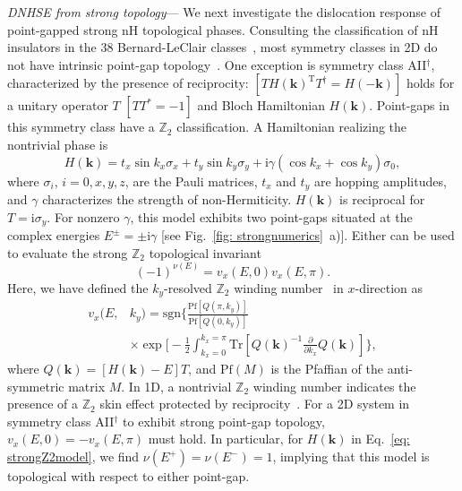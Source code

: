 \documentclass[aps,prl,twocolumn,amsmath,amssymb,floatfix,superscriptaddress]{revtex4-2}
\newcommand{\bs}[1]{\boldsymbol{#1}}
\begin{document}
\emph{DNHSE from strong topology}--- We next investigate the dislocation response of point-gapped strong nH topological phases. Consulting the classification of nH insulators in the 38 Bernard-LeClair classes~\cite{KawabataClassification19}, most symmetry classes in 2D do not have intrinsic point-gap topology~\cite{TopoSkin20}. One exception is symmetry class AII$^\dagger$, characterized by the presence of reciprocity: $[T H(\bs{k})^\mathrm{T} T^\dagger = H(-\bs{k})]$ holds for a unitary operator $T$ $[T T^* = -1]$ and Bloch Hamiltonian $H(\bs{k})$.
Point-gaps in this symmetry class have a $\mathbb{Z}_2$ classification. A Hamiltonian realizing the nontrivial phase is~\cite{TopoSkin20}
\begin{equation} \label{eq: strongZ2model}
H(\bs{k}) = t_x \sin k_x \sigma_x + t_y \sin k_y \sigma_y + \mathrm{i} \gamma (\cos k_x + \cos k_y) \sigma_0,
\end{equation}
where $\sigma_i$, $i = 0,x,y,z$, are the Pauli matrices, $t_x$ and $t_y$ are hopping amplitudes, and $\gamma$ characterizes the strength of non-Hermiticity.
$H(\bs{k})$ is reciprocal for $T = \mathrm{i}\sigma_y$. For nonzero $\gamma$, this model exhibits two point-gaps situated at the complex energies $E^\pm = \pm \mathrm{i} \gamma$ [see Fig.~\ref{fig: strongnumerics}~a)]. Either can be used to evaluate the strong $\mathbb{Z}_2$ topological invariant~\cite{KawabataClassification19}
\begin{equation} \label{eq: 2Dstronginvariant}
(-1)^{\nu(E)} = v_x (E,0) v_x (E,\pi).
\end{equation}
Here, we have defined the $k_y$-resolved $\mathbb{Z}_2$ winding number~\cite{TopoSkin20} in $x$-direction as
\begin{equation}
\begin{aligned}
v_x (E,&k_y) = \mathrm{sgn} \Bigg\{\frac{\mathrm{Pf}[Q(\pi,k_y)]}{\mathrm{Pf}[Q(0,k_y)]}
\\
&\times\exp \bigg[-\frac{1}{2} \int_{k_x = 0}^{k_x = \pi} \mathrm{Tr}\left[Q(\bs{k})^{-1} \frac{\partial}{\partial{k_{x}}} Q(\bs{k})\right]\Bigg\},
\end{aligned}
\end{equation}
where $Q(\bs{k}) = [H(\bs{k})-E]T$, and $\mathrm{Pf}(M)$ is the Pfaffian of the anti-symmetric matrix $M$.
In 1D, a nontrivial $\mathbb{Z}_2$ winding number indicates the presence of a $\mathbb{Z}_2$ skin effect protected by reciprocity~\cite{TopoSkin20}. For a 2D system in symmetry class AII$^\dagger$ to exhibit strong point-gap topology, $v_x (E,0) = - v_x (E,\pi)$ must hold. In particular, for $H(\bs{k})$ in Eq.~\eqref{eq: strongZ2model}, we find $\nu(E^+) = \nu(E^-) = 1$, implying that this model is topological with respect to either point-gap. %
\end{document}
